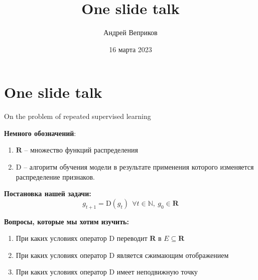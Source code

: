 \documentclass[10pt]{beamer}
\title[One slide talk]{One slide talk}
\author[Андрей Веприков]{Андрей Веприков}
\date[16 марта 2023]
{16 марта 2023}
\begin{document}
\section{One slide talk}
    \begin{frame}{On the problem of repeated supervised learning}
        \footnotesize
        \begin{minipage}[t]{0.44\textwidth} 
            \textbf{Немного обозначений}:
            \begin{enumerate}
                \item $\mathbf{R}$ -- множество функций распределения

                \item $\text{D}$ -- алгоритм обучения модели в результате применения которого изменяется распределение признаков.
            \end{enumerate}
            \textbf{Постановка нашей задачи:}
            $$g_{t+1} = \text{D}(g_t) ~~\forall t \in \mathbb{N}, ~g_0 \in \mathbf{R}$$

            \textbf{Вопросы, которые мы хотим изучить:}
            \begin{enumerate}
                \item При каких условиях оператор $\text{D}$ переводит $\mathbf{R}$ в $E \subseteq \mathbf{R}$

                \item При каких условиях оператор $\text{D}$ является сжимающим отображением

                \item При каких условиях оператор $\text{D}$ имеет неподвижную точку


\end{enumerate}
\end{minipage}
\end{frame}
\end{document}
